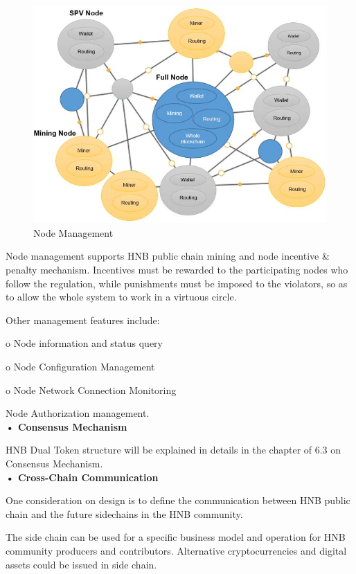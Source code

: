 \documentclass[fleqn,10pt]{SelfArx} %
\begin{document}
\begin{figure}[ht]\centering %
\includegraphics[width=\linewidth]{39}
\caption{Node Management}
\label{fig:23}
\end{figure}
Node management supports HNB public chain mining and node incentive \& penalty mechanism. Incentives must be rewarded to the participating nodes who follow the regulation, while punishments must be imposed to the violators, so as to allow the whole system to work in a virtuous circle.

Other management features include:

o	Node information and status query

o	Node Configuration Management

o	Node Network Connection Monitoring

Node Authorization management. \\

\textbf {•	Consensus Mechanism}

HNB Dual Token structure will be explained in details in the chapter of 6.3 on Consensus Mechanism. \\

\textbf {•	Cross-Chain Communication}

One consideration on design is to define the communication between HNB public chain and the future sidechains in the HNB community.

The side chain can be used for a specific business model and operation for HNB community producers and contributors. Alternative cryptocurrencies and digital assets could be issued in side chain.
\end{document}

